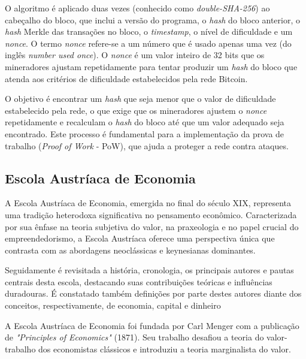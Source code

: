 \documentclass[article,12pt,oneside,a4paper,english,brazil]{unifil}
\begin{document}
\begin{Spacing}{1.5}
O algoritmo é aplicado duas vezes (conhecido como \textit{double-SHA-256}) ao cabeçalho do bloco, que inclui a versão do programa, o \textit{hash} do bloco anterior, o \textit{hash} Merkle das transações no bloco, o \textit{timestamp}, o nível de dificuldade e um \textit{nonce}. O termo \textit{nonce} refere-se a um número que é usado apenas uma vez (do inglês \textit{number used once}). O \textit{nonce} é um valor inteiro de 32 bits que os mineradores ajustam repetidamente para tentar produzir um \textit{hash} do bloco que atenda aos critérios de dificuldade estabelecidos pela rede Bitcoin.

O objetivo é encontrar um \textit{hash} que seja menor que o valor de dificuldade estabelecido pela rede, o que exige que os mineradores ajustem o \textit{nonce} repetidamente e recalculam o \textit{hash} do bloco até que um valor adequado seja encontrado. Este processo é fundamental para a implementação da prova de trabalho (\textit{Proof of Work} - PoW), que ajuda a proteger a rede contra ataques.

\subsection*{Escola Austríaca de Economia} \label{sec:austriaca}

A Escola Austríaca de Economia, emergida no final do século XIX, representa uma tradição heterodoxa significativa no pensamento econômico. Caracterizada por sua ênfase na teoria subjetiva do valor, na praxeologia e no papel crucial do empreendedorismo, a Escola Austríaca oferece uma perspectiva única que contrasta com as abordagens neoclássicas e keynesianas dominantes.

Seguidamente é revisitada a história, cronologia, os principais autores e pautas centrais desta escola, destacando suas contribuições teóricas e influências duradouras. É constatado também definições por parte destes autores diante dos conceitos, respectivamente, de economia, capital e dinheiro


A Escola Austríaca de Economia foi fundada por Carl Menger com a publicação de \textit{"Principles of Economics"} (1871). Seu trabalho desafiou a teoria do valor-trabalho dos economistas clássicos e introduziu a teoria marginalista do valor.


\end{Spacing}
\end{document}
